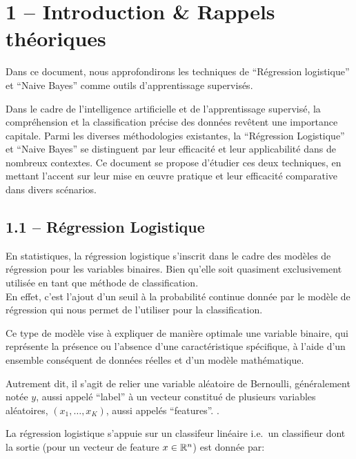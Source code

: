 \documentclass[
]{article}
\author{}
\date{}
\begin{document}
\intro{}

\hypertarget{introduction-rappels-thuxe9oriques}{%
\section{1 -- Introduction \& Rappels
théoriques}\label{introduction-rappels-thuxe9oriques}}

Dans ce document, nous approfondirons les techniques de ``Régression
logistique'' et ``Naive Bayes'' comme outils d'apprentissage supervisés.

Dans le cadre de l'intelligence artificielle et de l'apprentissage
supervisé, la compréhension et la classification précise des données
revêtent une importance capitale. Parmi les diverses méthodologies
existantes, la ``Régression Logistique'' et ``Naive Bayes'' se
distinguent par leur efficacité et leur applicabilité dans de nombreux
contextes. Ce document se propose d'étudier ces deux techniques, en
mettant l'accent sur leur mise en œuvre pratique et leur efficacité
comparative dans divers scénarios.

\hypertarget{ruxe9gression-logistique}{%
\subsection{1.1 -- Régression
Logistique}\label{ruxe9gression-logistique}}

En statistiques, la régression logistique s'inscrit dans le cadre des
modèles de régression pour les variables binaires. Bien qu'elle soit
quasiment exclusivement utilisée en tant que méthode de
classification.\\
En effet, c'est l'ajout d'un seuil à la probabilité continue donnée par
le modèle de régression qui nous permet de l'utiliser pour la
classification.

Ce type de modèle vise à expliquer de manière optimale une variable
binaire, qui représente la présence ou l'absence d'une caractéristique
spécifique, à l'aide d'un ensemble conséquent de données réelles et d'un
modèle mathématique.

Autrement dit, il s'agit de relier une variable aléatoire de Bernoulli,
généralement notée \(y\), aussi appelé ``label'' à un vecteur constitué
de plusieurs variables aléatoires, \((x_1, \ldots, x_K)\), aussi appelés
``features''. \cite{RegressionLogistique2023}.

La régression logistique s'appuie sur un classifeur linéaire
\cite{ClassifieurLineaire2022} i.e.~un classifieur dont la sortie (pour
un vecteur de feature \(x \in \mathbb{R}^n\)) est donnée par:
\end{document}
